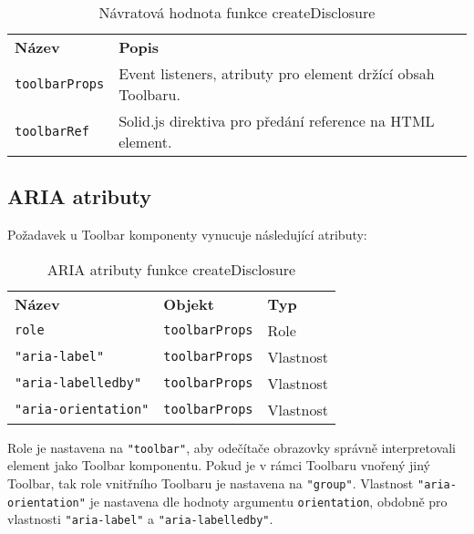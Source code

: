 \begin{table}[ht]\label{table:toolbar-return}
    \begin{ctucolortab}
        \begin{tabularx}{\textwidth}{p{3cm} X}
            \bfseries Název       & \bfseries Popis                                              \\\Midrule{}
            \texttt{toolbarProps} & Event listeners, atributy pro element držící obsah Toolbaru. \\
            \texttt{toolbarRef}   & Solid.js direktiva pro předání reference na HTML element.
        \end{tabularx}
    \end{ctucolortab}
    \caption{Návratová hodnota funkce createDisclosure}
\end{table}

\clearpage

\subsection{ARIA atributy}

Požadavek \hyperref[ofr12]{} u Toolbar komponenty vynucuje následující atributy:

\begin{table}[ht]\label{table:toolbar-aria}
    \begin{ctucolortab}
        \begin{tabularx}{\textwidth}{X X X}
            \bfseries Název             & \bfseries Objekt      & \bfseries Typ \\\Midrule{}
            \texttt{role}               & \texttt{toolbarProps} & Role          \\
            \texttt{"aria-label"}       & \texttt{toolbarProps} & Vlastnost     \\
            \texttt{"aria-labelledby"}  & \texttt{toolbarProps} & Vlastnost     \\
            \texttt{"aria-orientation"} & \texttt{toolbarProps} & Vlastnost
        \end{tabularx}
    \end{ctucolortab}
    \caption{ARIA atributy funkce createDisclosure}
\end{table}

Role je nastavena na \texttt{"toolbar"}, aby odečítače obrazovky správně interpretovali element jako Toolbar komponentu.
Pokud je v rámci Toolbaru vnořený jiný Toolbar, tak role vnitřního Toolbaru je nastavena na \texttt{"group"}.
Vlastnost \texttt{"aria-orientation"} je nastavena dle hodnoty argumentu \texttt{orientation}, obdobně pro vlastnosti \texttt{"aria-label"} a \texttt{"aria-labelledby"}.

